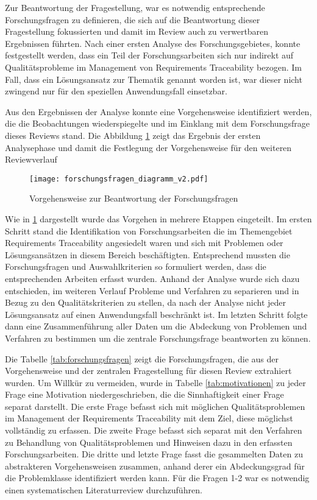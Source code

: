 Zur Beantwortung der Fragestellung, war es notwendig entsprechende Forschungsfragen zu definieren, die sich auf die Beantwortung dieser Fragestellung fokussierten und damit im Review auch zu verwertbaren Ergebnissen führten. Nach einer ersten Analyse des Forschungsgebietes, konnte festgestellt werden, dass ein Teil der Forschungsarbeiten sich nur indirekt auf Qualitätsprobleme im Management von Requirements Traceability bezogen. Im Fall, dass ein Lösungsansatz zur Thematik genannt worden ist, war dieser nicht zwingend nur für den speziellen Anwendungsfall einsetzbar.

Aus den Ergebnissen der Analyse konnte eine Vorgehensweise identifiziert werden, die die Beobachtungen wiederspiegelte und im Einklang mit dem Forschungsfrage dieses Reviews stand. Die Abbildung \ref{fig:abb_forschungsfragen} zeigt das Ergebnis der ersten Analysephase und damit die Festlegung der Vorgehensweise für den weiteren Reviewverlauf

\begin{figure}[!htb]
  \centering
  \texttt{[image: forschungsfragen\_diagramm\_v2.pdf]}
  \caption{Vorgehensweise zur Beantwortung der Forschungsfragen}
  \label{fig:abb_forschungsfragen}
\end{figure}


Wie in \ref{fig:abb_forschungsfragen} dargestellt wurde das Vorgehen in mehrere Etappen eingeteilt. Im ersten Schritt stand die Identifikation von Forschungsarbeiten die im Themengebiet Requirements Traceability angesiedelt waren und sich mit Problemen oder Lösungsansätzen in diesem Bereich beschäftigten. Entsprechend mussten die Forschungsfragen und Auswahlkriterien so formuliert werden, dass die entsprechenden Arbeiten erfasst wurden. Anhand der Analyse wurde sich dazu entschieden, im weiteren Verlauf Probleme und Verfahren zu separieren und in Bezug zu den Qualitätskriterien zu stellen, da nach der Analyse nicht jeder Lösungsansatz auf einen Anwendungsfall beschränkt ist. Im letzten Schritt folgte dann eine Zusammenführung aller Daten um die Abdeckung von Problemen und Verfahren zu bestimmen um die zentrale Forschungsfrage beantworten zu können.

Die Tabelle \ref{tab:forschungsfragen} zeigt die Forschungsfragen, die aus der Vorgehensweise und der zentralen Fragestellung für diesen Review extrahiert wurden. Um Willkür zu vermeiden, wurde in Tabelle \ref{tab:motivationen} zu jeder Frage eine Motivation niedergeschrieben, die die Sinnhaftigkeit einer Frage separat darstellt. Die erste Frage befasst sich mit möglichen Qualitätsproblemen im Management der Requirements Traceability mit dem Ziel, diese möglichst vollständig zu erfassen. Die zweite Frage befasst sich separat mit den Verfahren zu Behandlung von Qualitätsproblemen und Hinweisen dazu in den erfassten Forschungsarbeiten. Die dritte und letzte Frage fasst die gesammelten Daten zu abstrakteren Vorgehensweisen zusammen, anhand derer ein Abdeckungsgrad für die Problemklasse identifiziert werden kann. Für die Fragen 1-2 war es notwendig einen systematischen Literaturreview durchzuführen. 

